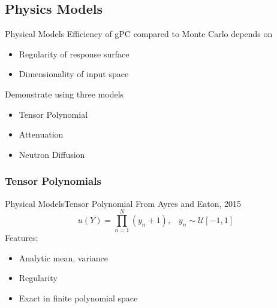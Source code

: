 \documentclass{beamer}
\begin{document}
\subsection{Physics Models}
\begin{frame}{Physical Models}{}%
  Efficiency of gPC compared to Monte Carlo depends on
  \begin{itemize}
    \item Regularity of response surface
    \item Dimensionality of input space
  \end{itemize}
  Demonstrate using three models
  \begin{itemize}
    \item Tensor Polynomial
    \item Attenuation
    \item Neutron Diffusion
  \end{itemize}
\end{frame}

\subsubsection{Tensor Polynomials}
\begin{frame}{Physical Models}{Tensor Polynomial}%
  From Ayres and Eaton, 2015
  \begin{equation*}
    u(Y) = \prod_{n=1}^N (y_n+1), \hspace{10pt}y_n\sim\mathcal{U}[-1,1]
  \end{equation*}
  Features:
  \begin{itemize}
    \item Analytic mean, variance
    \item Regularity
    \item Exact in finite polynomial space
  \end{itemize}
\end{frame}
\end{document}

